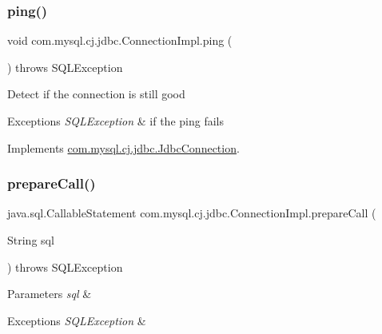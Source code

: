 \subsubsection{\texorpdfstring{ping()}{ping()}}
{\footnotesize\ttfamily void com.\+mysql.\+cj.\+jdbc.\+Connection\+Impl.\+ping (\begin{DoxyParamCaption}{ }\end{DoxyParamCaption}) throws S\+Q\+L\+Exception}

Detect if the connection is still good


\begin{DoxyExceptions}{Exceptions}
{\em S\+Q\+L\+Exception} & if the ping fails \\
\hline
\end{DoxyExceptions}


Implements \mbox{\hyperlink{interfacecom_1_1mysql_1_1cj_1_1jdbc_1_1_jdbc_connection_a6d078258f83ddc438d64bafb0f665004}{com.\+mysql.\+cj.\+jdbc.\+Jdbc\+Connection}}.

\mbox{\label{classcom_1_1mysql_1_1cj_1_1jdbc_1_1_connection_impl_aa4436c4ed7f7b2c5ea3f12b62486e844}} 
\subsubsection{\texorpdfstring{prepare\+Call()}{prepareCall()}\hspace{0.1cm}{\footnotesize\ttfamily [1/2]}}
{\footnotesize\ttfamily java.\+sql.\+Callable\+Statement com.\+mysql.\+cj.\+jdbc.\+Connection\+Impl.\+prepare\+Call (\begin{DoxyParamCaption}\item[{String}]{sql }\end{DoxyParamCaption}) throws S\+Q\+L\+Exception}


\begin{DoxyParams}{Parameters}
{\em sql} & \\
\hline
\end{DoxyParams}

\begin{DoxyExceptions}{Exceptions}
{\em S\+Q\+L\+Exception} & \\
\hline
\end{DoxyExceptions}
\mbox{\label{classcom_1_1mysql_1_1cj_1_1jdbc_1_1_connection_impl_a92f3c0f9e16a6a2a59ab6faff6838154}} 
